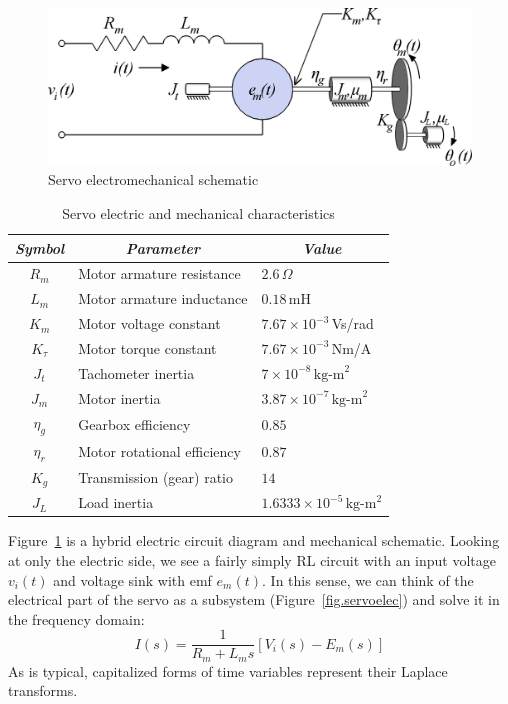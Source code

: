 \begin{figure}[bht]
\centering
\includegraphics[scale=\circscale]{servomotor}
\caption{ \footnotesize
        Servo electromechanical schematic
        \label{fig.servomotorschematic}
        }
\end{figure}

\begin{table}[bht]
\centering \renewcommand{\arraystretch}{1.2}
\begin{tabular}{c | l | l}
    \textit{Symbol} &\multicolumn{1}{c|}{\textit{Parameter}} &
        \multicolumn{1}{c}{\textit{Value}} \\ \hline \hline
    $R_m$       &   Motor armature resistance   & $2.6\,\Omega$     \\
    $L_m$       &   Motor armature inductance   & $0.18\,$mH        \\
    $K_m$       &   Motor voltage constant      &$7.67\times10^{-3}\,$Vs/rad\\
    $K_\tau$    &   Motor torque constant       & $7.67\times10^{-3}\,$Nm/A \\
    $J_t$       &   Tachometer inertia          &
                                            $7\times10^{-8}\,\mbox{kg-m}^2$ \\
    $J_m$       &   Motor inertia       & $3.87\times10^{-7}\,\mbox{kg-m}^2$\\
    $\eta_g$    &   Gearbox efficiency          & $0.85$            \\
    $\eta_r$    &   Motor rotational efficiency & $0.87$            \\
    $K_g$       &   Transmission (gear) ratio   & $14$              \\
    $J_L$       &   Load inertia        & $1.6333\times10^{-5}\,\mbox{kg-m}^2$
\end{tabular}
\caption{\footnotesize
        Servo electric and mechanical characteristics
        \label{tab.servoparams}
        }
\end{table}
\par
Figure~\ref{fig.servomotorschematic} is a hybrid electric circuit diagram and mechanical schematic.  Looking at only the electric side, we see a fairly simply RL circuit with an input voltage $v_i(t)$ and voltage sink with emf $e_m(t)$.  In this sense, we can think of the electrical part of the servo as a subsystem (Figure~\ref{fig.servoelec}) and solve it in the frequency domain:
\begin{equation}
    I(s) = \frac{1}{R_m + L_m s} \left[V_i(s) - E_m(s)\right]
        \label{eq.servoelec}
\end{equation}
As is typical, capitalized forms of time variables represent their Laplace transforms.

